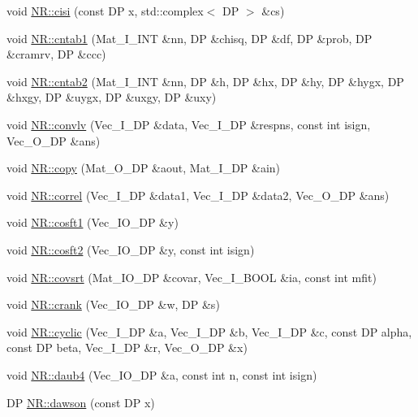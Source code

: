 \begin{DoxyCompactItemize}
\item 
void \mbox{\hyperlink{namespaceNR_abf0103a0b1c7451d1cad9852e6701274}{N\+R\+::cisi}} (const DP x, std\+::complex$<$ DP $>$ \&cs)
\item 
void \mbox{\hyperlink{namespaceNR_ac0de242c7ce066888f5add441fe1099e}{N\+R\+::cntab1}} (Mat\+\_\+\+I\+\_\+\+I\+NT \&nn, DP \&chisq, DP \&df, DP \&prob, DP \&cramrv, DP \&ccc)
\item 
void \mbox{\hyperlink{namespaceNR_a04d9c5104ecc26262c5c9cf755b6c496}{N\+R\+::cntab2}} (Mat\+\_\+\+I\+\_\+\+I\+NT \&nn, DP \&h, DP \&hx, DP \&hy, DP \&hygx, DP \&hxgy, DP \&uygx, DP \&uxgy, DP \&uxy)
\item 
void \mbox{\hyperlink{namespaceNR_a2082dd6448479336557410a290a17c2c}{N\+R\+::convlv}} (Vec\+\_\+\+I\+\_\+\+DP \&data, Vec\+\_\+\+I\+\_\+\+DP \&respns, const int isign, Vec\+\_\+\+O\+\_\+\+DP \&ans)
\item 
void \mbox{\hyperlink{namespaceNR_a33f0ee887bd75c78a6b2f97a825f5be1}{N\+R\+::copy}} (Mat\+\_\+\+O\+\_\+\+DP \&aout, Mat\+\_\+\+I\+\_\+\+DP \&ain)
\item 
void \mbox{\hyperlink{namespaceNR_a38e1298c084b073e4e7465dbd62ad7fb}{N\+R\+::correl}} (Vec\+\_\+\+I\+\_\+\+DP \&data1, Vec\+\_\+\+I\+\_\+\+DP \&data2, Vec\+\_\+\+O\+\_\+\+DP \&ans)
\item 
void \mbox{\hyperlink{namespaceNR_a3359e0c5092d8ab9afdbec3c55066b61}{N\+R\+::cosft1}} (Vec\+\_\+\+I\+O\+\_\+\+DP \&y)
\item 
void \mbox{\hyperlink{namespaceNR_a86490ad17a4fd0e6d60ea67f2588fd00}{N\+R\+::cosft2}} (Vec\+\_\+\+I\+O\+\_\+\+DP \&y, const int isign)
\item 
void \mbox{\hyperlink{namespaceNR_ac2f90a8cf35f76c733d46d6c217e7698}{N\+R\+::covsrt}} (Mat\+\_\+\+I\+O\+\_\+\+DP \&covar, Vec\+\_\+\+I\+\_\+\+B\+O\+OL \&ia, const int mfit)
\item 
void \mbox{\hyperlink{namespaceNR_a62558f3207c569f0bb176c97de157616}{N\+R\+::crank}} (Vec\+\_\+\+I\+O\+\_\+\+DP \&w, DP \&s)
\item 
void \mbox{\hyperlink{namespaceNR_abe6af2a0141e9c645da6b86e995dfe82}{N\+R\+::cyclic}} (Vec\+\_\+\+I\+\_\+\+DP \&a, Vec\+\_\+\+I\+\_\+\+DP \&b, Vec\+\_\+\+I\+\_\+\+DP \&c, const DP alpha, const DP beta, Vec\+\_\+\+I\+\_\+\+DP \&r, Vec\+\_\+\+O\+\_\+\+DP \&x)
\item 
void \mbox{\hyperlink{namespaceNR_afb5a6ee4e921ad8ae733cd25c9178abf}{N\+R\+::daub4}} (Vec\+\_\+\+I\+O\+\_\+\+DP \&a, const int n, const int isign)
\item 
DP \mbox{\hyperlink{namespaceNR_a6e1128d2427bfc7d48d0f09057399227}{N\+R\+::dawson}} (const DP x)

\end{DoxyCompactItemize}
